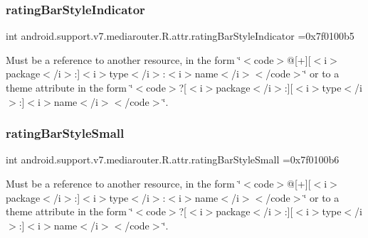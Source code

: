 \subsubsection{\texorpdfstring{rating\+Bar\+Style\+Indicator}{ratingBarStyleIndicator}}
{\footnotesize\ttfamily int android.\+support.\+v7.\+mediarouter.\+R.\+attr.\+rating\+Bar\+Style\+Indicator =0x7f0100b5\hspace{0.3cm}{\ttfamily [static]}}

Must be a reference to another resource, in the form \char`\"{}$<$code$>$@\mbox{[}+\mbox{]}\mbox{[}$<$i$>$package$<$/i$>$\+:\mbox{]}$<$i$>$type$<$/i$>$\+:$<$i$>$name$<$/i$>$$<$/code$>$\char`\"{} or to a theme attribute in the form \char`\"{}$<$code$>$?\mbox{[}$<$i$>$package$<$/i$>$\+:\mbox{]}\mbox{[}$<$i$>$type$<$/i$>$\+:\mbox{]}$<$i$>$name$<$/i$>$$<$/code$>$\char`\"{}. \mbox{\label{classandroid_1_1support_1_1v7_1_1mediarouter_1_1R_1_1attr_a715bb6d074e1060db1eaa65d018f0d65}} 
\subsubsection{\texorpdfstring{rating\+Bar\+Style\+Small}{ratingBarStyleSmall}}
{\footnotesize\ttfamily int android.\+support.\+v7.\+mediarouter.\+R.\+attr.\+rating\+Bar\+Style\+Small =0x7f0100b6\hspace{0.3cm}{\ttfamily [static]}}

Must be a reference to another resource, in the form \char`\"{}$<$code$>$@\mbox{[}+\mbox{]}\mbox{[}$<$i$>$package$<$/i$>$\+:\mbox{]}$<$i$>$type$<$/i$>$\+:$<$i$>$name$<$/i$>$$<$/code$>$\char`\"{} or to a theme attribute in the form \char`\"{}$<$code$>$?\mbox{[}$<$i$>$package$<$/i$>$\+:\mbox{]}\mbox{[}$<$i$>$type$<$/i$>$\+:\mbox{]}$<$i$>$name$<$/i$>$$<$/code$>$\char`\"{}. \mbox{\label{classandroid_1_1support_1_1v7_1_1mediarouter_1_1R_1_1attr_ad202a35ffdff81d10cb206fd09682d56}} 
